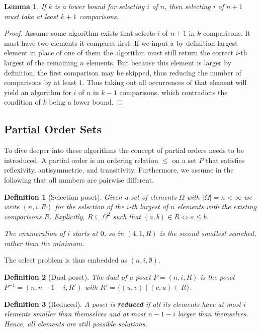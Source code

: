 \documentclass[10pt,journal,compsoc]{IEEEtran}
\newtheorem{lemma}{Lemma}
\newtheorem{definition}{Definition}
\begin{document}
\begin{lemma} \label{lemma:previous_next_poset}
  If $k$ is a lower bound for selecting $i$ of $n$, then selecting $i$ of $n + 1$ must take at least $k + 1$ comparisons.
\end{lemma}

\begin{proof}
  Assume some algorithm exists that selects $i$ of $n + 1$ in $k$ comparisons.
  It must have two elements it compares first.
  If we input a by definition largest element in place of one of them the algorithm must still return the correct $i$-th largest of the remaining $n$ elements.
  But because this element is larger by definition, the first comparison may be skipped, thus reducing the number of comparisons by at least $1$.
  Thus taking out all occurrences of that element will yield an algorithm for $i$ of $n$ in $k - 1$ comparisons, which contradicts the condition of $k$ being a lower bound.
\end{proof}

\subsection{Partial Order Sets}
To dive deeper into these algorithms the concept of partial orders needs to be introduced.
A partial order is an ordering relation $\leq$ on a set $P$ that satisfies reflexivity, antisymmetrie, and transitivity.
Furthermore, we assume in the following that all numbers are pairwise different.

\begin{definition}[Selection poset]
  Given a set of elements $\Omega$ with $|\Omega| = n < \infty$ we write $(n, i, R)$ for the selection of the $i$-th largest of $n$ elements with the existing comparisons $R$.
  Explicitly, $R\subseteq\Omega^2$ such that $(a, b)\in R \Longleftrightarrow a \leq b$.

  The enumeration of $i$ starts at $0$, so in $(4, 1, R)$ is the second smallest searched, rather than the minimum.
\end{definition}

The select problem is thus embedded as $(n, i, \emptyset)$.

\begin{definition}[Dual poset] \label{definition:dual_poset}
  The dual of a poset $P = (n, i, R)$ is the poset $P^{-1} = (n, n - 1 - i, R')$ with $R' = \{(u,v) \mid (v,u) \in R\}$.
\end{definition}

\begin{definition}[Reduced] \label{definition:reduced_poset}
  A poset is \textbf{reduced} if all its elements have at most $i$ elements smaller than themselves and at most $n - 1 - i$ larger than themselves.
  Hence, all elements are still possible solutions.
\end{definition}
\end{document}
